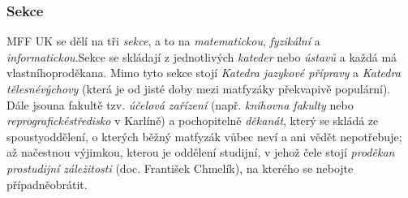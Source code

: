 \subsubsection{Sekce}
MFF UK se dělí na tři \textit{sekce}, a to na \textit{matematickou},
\textit{fyzikální} a \textit{informatickou}.Sekce se skládají z jednotlivých
\textit{kateder} nebo \textit{ústavů} a každá má vlastníhoproděkana. Mimo tyto
sekce stojí \textit{Katedra jazykové přípravy} a \textit{Katedra tělesnévýchovy}
(která je od jisté doby mezi matfyzáky překvapivě populární). Dále jsouna
fakultě tzv. \textit{účelová zařízení} (např. \textit{knihovna fakulty} nebo
\textit{reprografickéstředisko} v Karlíně) a pochopitelně \textit{děkanát},
který se skládá ze spoustyoddělení, o kterých běžný matfyzák vůbec neví a ani
vědět nepotřebuje; až načestnou výjimkou, kterou je oddělení studijní, v jehož
čele stojí \textit{proděkan prostudijní záležitosti} (doc. František Chmelík),
na kterého se nebojte případněobrátit.
